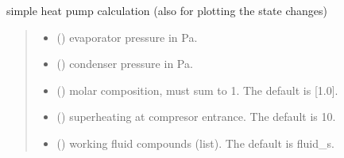 \documentclass[letterpaper,10pt,english]{sphinxmanual}
\begin{document}

\begin{fulllineitems}
\label{\detokenize{mixture_search:mixture_search.hp_calc}}
\pysigstartsignatures
{}
\pysigstopsignatures
\sphinxAtStartPar
simple heat pump calculation (also for plotting the state changes)
\begin{quote}\begin{description}
\begin{itemize}
\item {} 
\sphinxAtStartPar
{} () \textendash{} evaporator pressure in Pa.

\item {} 
\sphinxAtStartPar
{} () \textendash{} condenser pressure in Pa.

\item {} 
\sphinxAtStartPar
{} (\sphinxstyleliteralemphasis{\sphinxupquote{, }}) \textendash{} molar composition, must sum to 1. The default is {[}1.0{]}.

\item {} 
\sphinxAtStartPar
{} (\sphinxstyleliteralemphasis{\sphinxupquote{, }}) \textendash{} superheating at compresor entrance. The default is 10.

\item {} 
\sphinxAtStartPar
{} (\sphinxstyleliteralemphasis{\sphinxupquote{(}}\sphinxstyleliteralemphasis{\sphinxupquote{)}}\sphinxstyleliteralemphasis{\sphinxupquote{, }}) \textendash{} working fluid compounds (list). The default is fluid\_s.


\end{itemize}
\end{description}
\end{quote}
\end{fulllineitems}
\end{document}
